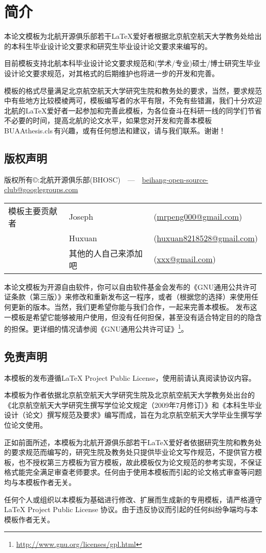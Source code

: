 \chapter{简介}
    本论文模板为北航开源俱乐部若干\LaTeX{}爱好者根据北京航空航天大学教务处给出的本科生毕业设计论文要求和研究生毕业设计论文要求来编写的。\par
    目前模板支持北航本科毕业设计论文要求规范和(学术/专业)硕士/博士研究生毕业设计论文要求规范，对其格式的后期维护也将进一步的开发和完善。\par
    模板的格式尽量满足北京航空航天大学研究生院和教务处的要求，当然，要求规范中有些地方比较模棱两可，模板编写者的水平有限，不免有些错漏，我们十分欢迎北航的\LaTeX{}爱好者一起参加和完善此模板，为各位奋斗在科研一线的同学们节省不必要的时间，提高北航的论文水平，如果您对开发和完善本模板\,BUAAthesis.cls\,有兴趣，或有任何想法和建议，请与我们联系。谢谢！
    \section{版权声明}
版权所有\copyright :北航开源俱乐部(BHOSC)~~---~~\href{mailto:beihang-open-source-club@googlegroups.com}{beihang-open-source-club@googlegroups.com}
    \begin{tabular}{lll}
模板主要贡献者 & Joseph\quad & (\href{mailto:mrpeng000@gmail.com}{mrpeng000@gmail.com})\\
         ~ & Huxuan & (\href{mailto:huxuan8218528@gmail.com}{huxuan8218528@gmail.com})\\
        ~~ & 其他的人自己来添加吧 & (\href{mailto:xxx@gmail.com}{xxx@gmail.com})\\
    \end{tabular}
    \newline
\qquad 本论文模板为开源自由软件，你可以自由软件基金会发布的《GNU通用公共许可证条款（第三版）》来修改和重新发布这一程序，或者（根据您的选择）来使用任何更新的版本。当然，我们更希望你能与我们合作，一起来完善本模板。
    发布这一模板是希望它能够被用户使用，但没有任何担保，甚至没有适合特定目的的隐含的担保。更详细的情况请参阅《GNU通用公共许可证》\footnote{\url{http://www.gnu.org/licenses/gpl.html}}。

    \section{免责声明}
    本模板的发布遵循\LaTeX{} Project Public License，使用前请认真阅读协议内容。\par
    本模板为作者依据北京航空航天大学研究生院及北京航空航天大学教务处出台的《北京航空航天大学研究生撰写学位论文规定（2009年7月修订）》和《本科生毕业设计（论文）撰写规范及要求》编写而成，旨在为北京航空航天大学毕业生撰写学位论文使用。\par
    正如前面所述，本模板为北航开源俱乐部若干\LaTeX{}爱好者依据研究生院和教务处的要求规范而编写的，研究生院及教务处只提供毕业论文写作规范，不提供官方模板，也不授权第三方模板为官方模板，故此模板仅为论文规范的参考实现，不保证格式能完全满足审查老师要求。任何由于使用本模板而引起的论文格式审查等问题均与本模板作者无关。\par
    任何个人或组织以本模板为基础进行修改、扩展而生成新的专用模板，请严格遵守\LaTeX{} Project Public License 协议。由于违反协议而引起的任何纠纷争端均与本模板作者无关。
